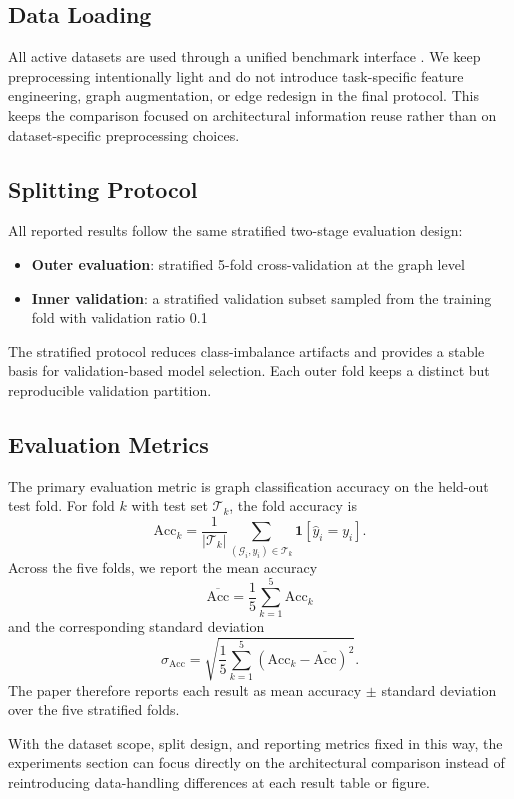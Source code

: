 

\subsection{Data Loading}

All active datasets are used through a unified benchmark interface \cite{fey2019fast,morris2020tudataset}. We keep preprocessing intentionally light and do not introduce task-specific feature engineering, graph augmentation, or edge redesign in the final protocol. This keeps the comparison focused on architectural information reuse rather than on dataset-specific preprocessing choices.

\subsection{Splitting Protocol}

All reported results follow the same stratified two-stage evaluation design:

\begin{itemize}
    \item \textbf{Outer evaluation}: stratified 5-fold cross-validation at the graph level
    \item \textbf{Inner validation}: a stratified validation subset sampled from the training fold with validation ratio 0.1
\end{itemize}

The stratified protocol reduces class-imbalance artifacts and provides a stable basis for validation-based model selection. Each outer fold keeps a distinct but reproducible validation partition.

\subsection{Evaluation Metrics}

The primary evaluation metric is graph classification accuracy on the held-out test fold. For fold $k$ with test set $\mathcal{T}_k$, the fold accuracy is
\begin{equation}
\mathrm{Acc}_k = \frac{1}{|\mathcal{T}_k|}\sum_{(\mathcal{G}_i,y_i)\in\mathcal{T}_k}\mathbf{1}\!\left[\hat{y}_i = y_i\right].
\end{equation}
Across the five folds, we report the mean accuracy
\begin{equation}
\overline{\mathrm{Acc}} = \frac{1}{5}\sum_{k=1}^{5}\mathrm{Acc}_k
\end{equation}
and the corresponding standard deviation
\begin{equation}
\sigma_{\mathrm{Acc}} = \sqrt{\frac{1}{5}\sum_{k=1}^{5}\left(\mathrm{Acc}_k-\overline{\mathrm{Acc}}\right)^2 }.
\end{equation}
The paper therefore reports each result as mean accuracy $\pm$ standard deviation over the five stratified folds.

With the dataset scope, split design, and reporting metrics fixed in this way, the experiments section can focus directly on the architectural comparison instead of reintroducing data-handling differences at each result table or figure.
